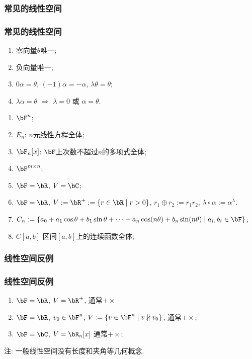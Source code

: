 \subsubsection{常见的线性空间}
\begin{frame}\frametitle{常见的线性空间}

\begin{proposition}
\begin{enumerate}
\item 零向量$\theta$唯一;\pp
\item 负向量唯一;\pp
\item $0\alpha =\theta$, $(-1)\alpha=-\alpha$, $\lambda\theta=\theta$;\pp
\item $\lambda\alpha = \theta$ $\Rightarrow$ $\lambda=0$ 或 $\alpha=\theta$.
\end{enumerate}
\end{proposition}

\begin{example}
\begin{enumerate}
\item $\bF^n$;\pp
\item $E_n$: $n$元线性方程全体;\pp
\item $\bF_n[x]$: $\bF$上次数不超过$n$的多项式全体;\pp
\item $\bF^{m\times n}$;\pp
\item $\bF=\bR$, $V=\bC$;\pp
\item $\bF=\bR$, $V:=\bR^+:=\{r\in\bR\mid r > 0\}$, $r_1\oplus r_2:=r_1r_2$, $\lambda\circ \alpha:=\alpha^\lambda$.\pp
\item $C_n:=\{a_0+a_1\cos\theta+b_1\sin\theta+\cdots+a_n\cos(n\theta)+b_n\sin(n\theta)\mid a_i,b_i\in \bF\}$;\pp
\item $C[a,b]$ 区间$[a,b]$上的连续函数全体;
\end{enumerate}
\end{example}
\end{frame}


\renewcommand{\mydate}{2025年04月22号\ 第十七次课}


\subsubsection{线性空间反例}
\begin{frame}\frametitle{线性空间反例}

\begin{example}[反例]
\begin{enumerate}
\item $\bF=\bR$, $V=\bR^+$, 通常$+\times$ \pp
\item $\bF=\bR$, $v_0\in \bF^n$, $V:=\{v\in \bF^n\mid  v\nparallel v_0\}$, 通常$+\times$;\pp
\item $\bF=\bC$, $V=\bR_n[x]$ 通常$+\times$; \pp
\end{enumerate}
\end{example}

注: 一般线性空间没有长度和夹角等几何概念.
\end{frame}





